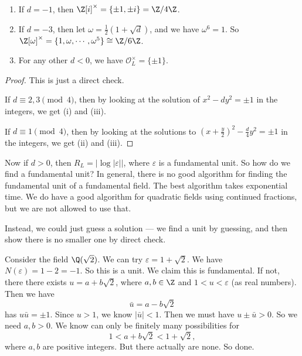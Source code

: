 \documentclass[a4paper]{article}
\begin{document}
\begin{lemma}\leavevmode
  \begin{enumerate}
    \item If $d = -1$, then $\Z[i]^{\times} = \{\pm 1, \pm i\} = \Z/4\Z$.
    \item If $d = -3$, then let $\omega = \frac{1}{2}(1 + \sqrt{d})$, and we have $\omega^6 = 1$. So $\Z[\omega]^{\times} = \{1, \omega, \cdots, \omega^5\} \cong \Z/6\Z$.
    \item For any other $d < 0$, we have $\mathcal{O}_L^\times = \{\pm 1\}$.
  \end{enumerate}
\end{lemma}

\begin{proof}
  This is just a direct check.

  If $d \equiv 2, 3 \pmod 4$, then by looking at the solution of $x^2 - dy^2 = \pm 1$ in the integers, we get (i) and (iii).

  If $d\equiv 1 \pmod 4$, then by looking at the solutions to $\left(x + \frac{y}{2}\right)^2 - \frac{d}{4}y^2 = \pm 1$ in the integers, we get (ii) and (iii).
\end{proof}

Now if $d > 0$, then $R_L = |\log|\varepsilon||$, where $\varepsilon$ is a fundamental unit. So how do we find a fundamental unit? In general, there is no good algorithm for finding the fundamental unit of a fundamental field. The best algorithm takes exponential time. We do have a good algorithm for quadratic fields using continued fractions, but we are not allowed to use that.

Instead, we could just guess a solution --- we find a unit by guessing, and then show there is no smaller one by direct check.

\begin{eg}
  Consider the field $\Q(\sqrt{2})$. We can try $\varepsilon = 1 + \sqrt{2}$. We have $N(\varepsilon) = 1 - 2 = -1$. So this is a unit. We claim this is fundamental. If not, there there exists $u = a + b\sqrt{2}$, where $a, b \in \Z$ and $1 < u < \varepsilon$ (as real numbers). Then we have
  \[
    \bar{u} = a - b\sqrt{2}
  \]
  has $u\bar{u} = \pm 1$. Since $u > 1$, we know $|\bar{u}| < 1$. Then we must have $u \pm \bar{u} > 0$. So we need $a, b > 0$. We know can only be finitely many possibilities for
  \[
    1 < a + b\sqrt{2} < 1 + \sqrt{2},
  \]
  where $a, b$ are positive integers. But there actually are none. So done.
\end{eg}
\end{document}
